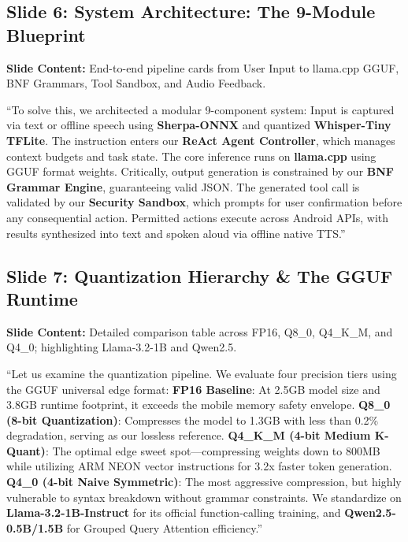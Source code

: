 \documentclass[11pt,a4paper]{article}
\begin{document}
\subsection{Slide 6: System Architecture: The 9-Module Blueprint}
\textbf{Slide Content:} End-to-end pipeline cards from User Input to llama.cpp GGUF, BNF Grammars, Tool Sandbox, and Audio Feedback.

\begin{scriptbox}
``To solve this, we architected a modular 9-component system:
Input is captured via text or offline speech using \textbf{Sherpa-ONNX} and quantized \textbf{Whisper-Tiny TFLite}.
The instruction enters our \textbf{ReAct Agent Controller}, which manages context budgets and task state.
The core inference runs on \textbf{llama.cpp} using GGUF format weights.
Critically, output generation is constrained by our \textbf{BNF Grammar Engine}, guaranteeing valid JSON.
The generated tool call is validated by our \textbf{Security Sandbox}, which prompts for user confirmation before any consequential action.
Permitted actions execute across Android APIs, with results synthesized into text and spoken aloud via offline native TTS.''
\end{scriptbox}

\subsection{Slide 7: Quantization Hierarchy \& The GGUF Runtime}
\textbf{Slide Content:} Detailed comparison table across FP16, Q8\_0, Q4\_K\_M, and Q4\_0; highlighting Llama-3.2-1B and Qwen2.5.

\begin{scriptbox}
``Let us examine the quantization pipeline. We evaluate four precision tiers using the GGUF universal edge format:
\textbf{FP16 Baseline}: At 2.5GB model size and 3.8GB runtime footprint, it exceeds the mobile memory safety envelope.
\textbf{Q8\_0 (8-bit Quantization)}: Compresses the model to 1.3GB with less than 0.2\% degradation, serving as our lossless reference.
\textbf{Q4\_K\_M (4-bit Medium K-Quant)}: The optimal edge sweet spot---compressing weights down to 800MB while utilizing ARM NEON vector instructions for 3.2x faster token generation.
\textbf{Q4\_0 (4-bit Naive Symmetric)}: The most aggressive compression, but highly vulnerable to syntax breakdown without grammar constraints.
We standardize on \textbf{Llama-3.2-1B-Instruct} for its official function-calling training, and \textbf{Qwen2.5-0.5B/1.5B} for Grouped Query Attention efficiency.''
\end{scriptbox}
\end{document}
